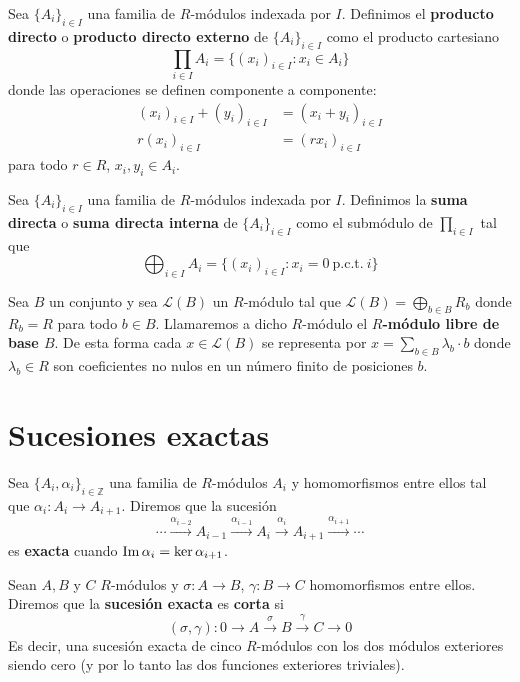\begin{definicion}
	Sea $\{A_i\}_{i \in I}$ una familia de $R$-módulos indexada por $I$. Definimos el \textbf{producto directo} o \textbf{producto directo externo} de $\{A_i\}_{i \in I}$ como el producto cartesiano 
	\[
	\prod_{i \in I} A_i = \{(x_i)_{i \in I} : x_i \in A_i \}
	\]
	donde las operaciones se definen componente a componente:
	\begin{align*}
		(x_i)_{i \in I} + (y_i)_{i \in I} &= (x_i+y_i)_{i \in I} \\
		r(x_i)_{i \in I} &= (rx_i)_{i \in I}
	\end{align*}
	para todo $r \in R$, $x_i,y_i \in A_i$.
\end{definicion}

\begin{definicion}
	Sea $\{A_i\}_{i \in I}$ una familia de $R$-módulos indexada por $I$. Definimos la \textbf{suma directa} o \textbf{suma directa interna} de $\{A_i\}_{i \in I}$ como el submódulo de $\prod_{i \in I}$ tal que 
	\[
		\bigoplus_{i \in I} A_i = \{(x_i)_{i \in I} : x_i = 0 \ \text{p.c.t.} \ i\}
	\]
\end{definicion}

\begin{definicion}
	Sea $B$ un conjunto y sea $\mathcal{L}(B)$ un $R$-módulo tal que $\mathcal{L}(B) = \bigoplus_{b \in B}R_b$ donde $R_b=R$ para todo $b \in B$. Llamaremos a dicho $R$-módulo el \textbf{$R$-módulo libre de base $B$}. De esta forma cada $x \in \mathcal{L}(B)$ se representa por $x = \sum_{b\in B}\lambda_b \cdot b$ donde $\lambda_b \in R$ son coeficientes no nulos en un número finito de posiciones $b$.
\end{definicion}

\section{Sucesiones exactas}

\begin{definicion}
	Sea $\{A_i, \alpha_i\}_{i \in \mathbb{Z}}$ una familia de $R$-módulos $A_i$ y homomorfismos entre ellos tal que $\alpha_i: A_i \rightarrow A_{i+1}$. Diremos que la sucesión
	\[ \cdots \xrightarrow{\alpha_{i-2}} A_{i-1} \xrightarrow{\alpha_{i-1}} A_i \xrightarrow{\alpha_{i}} A_{i+1} \xrightarrow{\alpha_{i+1}} \cdots \]
	es \textbf{exacta} cuando $\operatorname{Im} \alpha_i = \ker \alpha_{i+1}$.
\end{definicion}

\begin{definicion}
	Sean $A,B$ y $C$ $R$-módulos y $\sigma: A \rightarrow B$, $\gamma: B \rightarrow C$ homomorfismos entre ellos. Diremos que la \textbf{sucesión exacta} es \textbf{corta} si
	\[ (\sigma, \gamma): 0 \rightarrow A \xrightarrow{\sigma} B \xrightarrow{\gamma} C \rightarrow 0 \]
	Es decir, una sucesión exacta de cinco \(R\)-módulos con los dos módulos exteriores siendo cero (y por lo tanto las dos funciones exteriores triviales).
\end{definicion}

